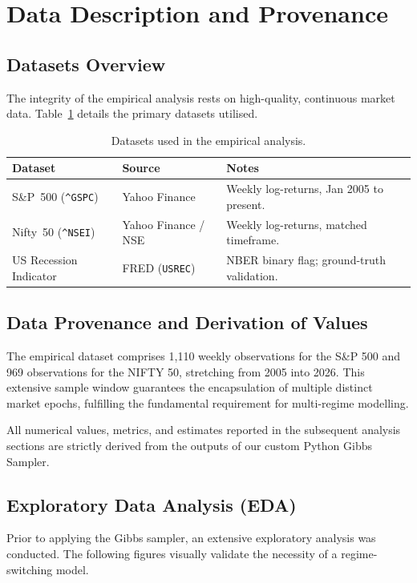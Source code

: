 \documentclass[12pt, a4paper]{article}
\begin{document}
\section{Data Description and Provenance}

\subsection{Datasets Overview}
The integrity of the empirical analysis rests on high-quality, continuous market data. Table~\ref{tab:data} details the primary datasets utilised.

\begin{table}[H]
\centering
\caption{Datasets used in the empirical analysis.}\label{tab:data}
\begin{tabular}{@{}llp{7.2cm}@{}}
\toprule
\textbf{Dataset} & \textbf{Source} & \textbf{Notes}\\
\midrule
S\&P~500 (\texttt{\^{}GSPC}) & Yahoo Finance & Weekly log-returns, Jan 2005 to present.\\[3pt]
Nifty~50 (\texttt{\^{}NSEI}) & Yahoo Finance / NSE & Weekly log-returns, matched timeframe.\\[3pt]
US Recession Indicator & FRED (\texttt{USREC}) & NBER binary flag; ground-truth validation.\\\bottomrule
\end{tabular}
\end{table}

\subsection{Data Provenance and Derivation of Values}
The empirical dataset comprises 1,110 weekly observations for the S\&P 500 and 969 observations for the NIFTY 50, stretching from 2005 into 2026. This extensive sample window guarantees the encapsulation of multiple distinct market epochs, fulfilling the fundamental requirement for multi-regime modelling. 

All numerical values, metrics, and estimates reported in the subsequent analysis sections are strictly derived from the outputs of our custom Python Gibbs Sampler.

\subsection{Exploratory Data Analysis (EDA)}
Prior to applying the Gibbs sampler, an extensive exploratory analysis was conducted. The following figures visually validate the necessity of a regime-switching model.
\end{document}
